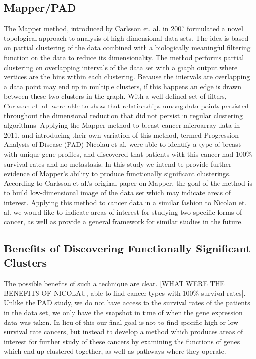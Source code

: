 \documentclass[preprint,10pt]{elsarticle}
\begin{document}
\subsection{Mapper/PAD}
The Mapper method, introduced by Carlsson et. al. in 2007 \cite{mapper} formulated a novel topological approach to analysis of high-dimensional data sets. The idea is based on partial clustering of the data combined with a biologically meaningful filtering function on the data to reduce its dimensionality. The method performs partial clustering on overlapping intervals of the data set with a graph output where vertices are the bins within each clustering. Because the intervals are overlapping a data point may end up in multiple clusters, if this happens an edge is drawn between these two clusters in the graph. With a well defined set of filters, Carlsson et. al. were able to show that relationships among data points persisted throughout the dimensional reduction that did not persist in regular clustering algorithms. Applying the Mapper method to breast cancer microarray data in 2011, and introducing their own variation of this method, termed Progression Analysis of Disease (PAD) Nicolau et al. \cite{nicolau} were able to identify a type of breast with unique gene profiles, and discovered that patients with this cancer had 100\% survival rates and no metastasis. In this study we intend to provide further evidence of Mapper's ability to produce functionally significant clusterings. According to Carlsson et al.'s original paper on Mapper, the goal of the method is to build low-dimensional image of the data set which may indicate areas of interest. Applying this method to cancer data in a similar fashion to Nicolau et. al. we would like to indicate areas of interest for studying two specific forms of cancer, as well as provide a general framework for similar studies in the future. 

\subsection{Benefits of Discovering Functionally Significant Clusters}
The possible benefits of such a technique are clear. [WHAT WERE THE BENEFITS OF NICOLAU, able to find cancer types with 100\% survival rates]. Unlike the PAD study, we do not have access to the survival rates of the patients in the data set, we only have the snapshot in time of when the gene expression data was taken. In lieu of this our final goal is not to find specific high or low survival rate cancers, but instead to develop a method which produces areas of interest for further study of these cancers by examining the functions of genes which end up clustered together, as well as pathways where they operate.
\end{document}
